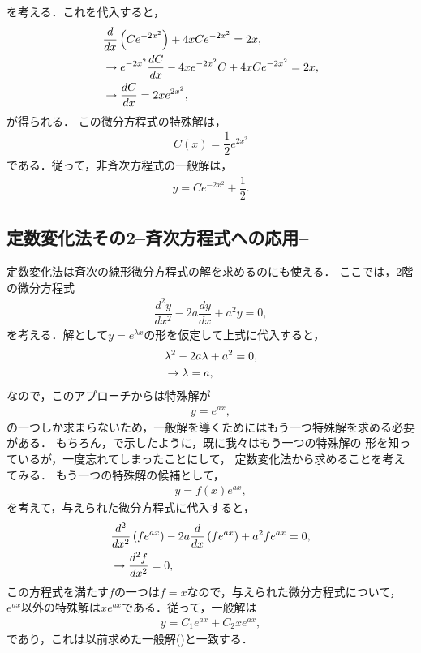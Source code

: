 を考える．これを代入すると，
\begin{align}
 & \dfrac{d}{dx}\left(Ce^{-2x^2}\right) + 4xCe^{-2x^2} = 2x, \notag \\
 & \rightarrow e^{-2x^2}\dfrac{dC}{dx}-4xe^{-2x^2}C + 4xCe^{-2x^2}= 2x, \notag \\
 & \rightarrow \dfrac{dC}{dx} = 2xe^{2x^2},
\end{align}
が得られる．
この微分方程式の特殊解は，
\begin{align}
  C(x) = \dfrac{1}{2}e^{2x^2} 
\end{align}
である．従って，非斉次方程式の一般解は，
\begin{align}
  y = Ce^{-2x^2} + \dfrac{1}{2}. 
\end{align}
%
\newpage
%
\subsection{定数変化法その2–斉次方程式への応用–}
%
定数変化法は斉次の線形微分方程式の解を求めるのにも使える．
ここでは，2階の微分方程式
\begin{align}
 \dfrac{d^2 y}{dx^2} - 2a\dfrac{dy}{dx} + a^2 y= 0, 
\end{align}
を考える．解として$y=e^{\lambda x}$の形を仮定して上式に代入すると，
\begin{align}
  &\lambda^2 - 2a \lambda + a^2 = 0,\notag \\
  &\rightarrow \lambda = a, \notag 
\end{align}
なので，このアプローチからは特殊解が
\begin{align}
  y = e^{ax}, 
\end{align}
の一つしか求まらないため，一般解を導くためにはもう一つ特殊解を求める必要がある．
もちろん，で示したように，既に我々はもう一つの特殊解の
形を知っているが，一度忘れてしまったことにして，
定数変化法から求めることを考えてみる．
もう一つの特殊解の候補として，
\begin{align}
  y = f(x) e^{ax}, 
\end{align}
を考えて，与えられた微分方程式に代入すると，
\begin{align}
  &\dfrac{d^2}{dx^2}\left(fe^{ax}\right) - 2a\dfrac{d}{dx}\left(fe^{ax}\right) + a^2 fe^{ax}=0, \notag \\
  &\rightarrow \dfrac{d^2 f}{dx^2} = 0, 
\end{align}
この方程式を満たす$f$の一つは$f=x$なので，与えられた微分方程式について，
$e^{ax}$以外の特殊解は$xe^{ax}$である．従って，一般解は
\begin{align}
 y = C_1 e^{ax} + C_2 xe^{ax},
\end{align}
であり，これは以前求めた一般解()と一致する．

